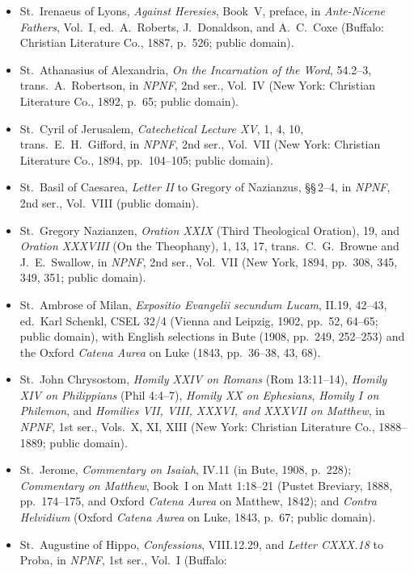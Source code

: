 \begin{itemize}
\item St.~Irenaeus of Lyons, \textit{Against Heresies}, Book~V, preface, in
\textit{Ante-Nicene Fathers}, Vol.~I, ed.\ A.~Roberts, J.~Donaldson, and
A.~C.~Coxe (Buffalo: Christian Literature Co., 1887, p.~526; public domain).
\item St.~Athanasius of Alexandria, \textit{On the Incarnation of the Word},
54.2--3, trans.\ A.~Robertson, in \textit{NPNF}, 2nd ser., Vol.~IV
(New York: Christian Literature Co., 1892, p.~65; public domain).
\item St.~Cyril of Jerusalem, \textit{Catechetical Lecture XV}, 1, 4, 10,
trans.\ E.~H.~Gifford, in \textit{NPNF}, 2nd ser., Vol.~VII (New York:
Christian Literature Co., 1894, pp.~104--105; public domain).
\item St.~Basil of Caesarea, \textit{Letter II} to Gregory of Nazianzus,
\S\S\,2--4, in \textit{NPNF}, 2nd ser., Vol.~VIII (public domain).
\item St.~Gregory Nazianzen, \textit{Oration XXIX} (Third Theological Oration),
19, and \textit{Oration XXXVIII} (On the Theophany), 1, 13, 17, trans.\
C.~G.~Browne and J.~E.~Swallow, in \textit{NPNF}, 2nd ser., Vol.~VII (New
York, 1894, pp.~308, 345, 349, 351; public domain).
\item St.~Ambrose of Milan, \textit{Expositio Evangelii secundum Lucam}, II.19,
42--43, ed.\ Karl Schenkl, CSEL 32/4 (Vienna and Leipzig, 1902, pp.~52, 64--65;
public domain), with English selections in Bute (1908, pp.~249, 252--253) and
the Oxford \textit{Catena Aurea} on Luke (1843, pp.~36--38, 43, 68).
\item St.~John Chrysostom, \textit{Homily XXIV on Romans} (Rom 13:11--14),
\textit{Homily XIV on Philippians} (Phil 4:4--7), \textit{Homily XX on
Ephesians}, \textit{Homily I on Philemon}, and \textit{Homilies VII, VIII,
XXXVI, and XXXVII on Matthew}, in \textit{NPNF}, 1st ser., Vols.~X, XI, XIII
(New York: Christian Literature Co., 1888--1889; public domain).
\item St.~Jerome, \textit{Commentary on Isaiah}, IV.11 (in Bute, 1908, p.~228);
\textit{Commentary on Matthew}, Book~I on Matt 1:18--21 (Pustet Breviary, 1888,
pp.~174--175, and Oxford \textit{Catena Aurea} on Matthew, 1842); and
\textit{Contra Helvidium} (Oxford \textit{Catena Aurea} on Luke, 1843, p.~67;
public domain).
\item St.~Augustine of Hippo, \textit{Confessions}, VIII.12.29, and
\textit{Letter CXXX.18} to Proba, in \textit{NPNF}, 1st ser., Vol.~I (Buffalo:

\end{itemize}
